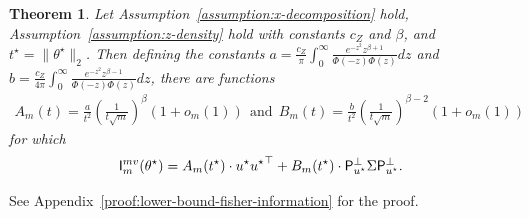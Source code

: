 \documentclass[11pt]{article}
\newcommand{\proj}{\mathsf{P}}
\newcommand{\norms}[1]{\|{#1}\|} %
\newcommand{\ltwos}[1]{\norms{#1}_2} %
\newcommand{\<}{\langle} %
\renewcommand{\>}{\rangle}
\newcommand{\opt}{^\star}
\newtheorem{theorem}{Theorem}
\begin{document}
\begin{theorem}
  \label{thm:lower-bound-fisher-information}
  Let Assumption~\ref{assumption:x-decomposition} hold,
  Assumption~\ref{assumption:z-density} hold with
  constants $c_Z$ and $\beta$,
  and $t\opt = \ltwos{\theta\opt}$.
  Then defining
  the constants
  $a = \frac{c_Z}{ \pi} \int_0^\infty \frac{e^{-z^2} z^{\beta+1}}{\Phi(-z) \Phi(z)} dz$ \mbox{and} $b = \frac{c_Z}{4 \pi} \int_0^\infty \frac{e^{-z^2} z^{\beta-1}}{\Phi(-z) \Phi(z)} dz$,
  there are functions
  \begin{align*}
    A_m(t) = \frac{a}{t^2} \left(\frac{1}{t\sqrt{m}}\right)^{\beta}( 1 + o_m(1))
    ~~ \mbox{and} ~~
    B_m(t) = \frac{b}{t^2}\left(\frac{1}{t\sqrt{m}}\right)^{\beta-2} (1 + o_m(1))
  \end{align*}
  for which
  \begin{equation*}
    \fishermv_m(\theta\opt) = A_m (t\opt) \cdot u\opt {u\opt}^\top + B_m(t\opt) \cdot \proj_{u\opt}^\perp \Sigma \proj_{u\opt}^\perp.
  \end{equation*}
\end{theorem}
\noindent
See Appendix~\ref{proof:lower-bound-fisher-information} for the proof.
\end{document}
